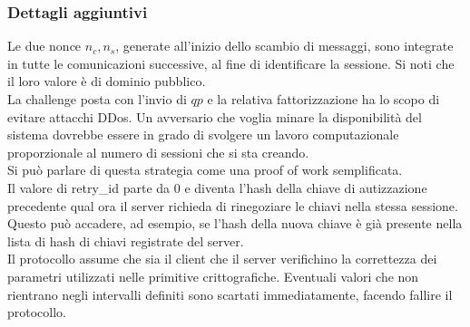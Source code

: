 \subsubsection{Dettagli aggiuntivi}
Le due nonce $n_c, n_s$, generate all'inizio dello scambio di messaggi, sono integrate in tutte le comunicazioni successive,
al fine di identificare la sessione.
Si noti che il loro valore è di dominio pubblico. \\

La challenge posta con l'invio di $qp$ e la relativa fattorizzazione ha lo scopo di evitare attacchi DDos.
Un avversario che voglia minare la disponibilità del sistema dovrebbe essere in grado di svolgere un lavoro computazionale
proporzionale al numero di sessioni che si sta creando. \\
Si può parlare di questa strategia come una proof of work semplificata. \\

Il valore di retry\_id parte da 0 e diventa l'hash della chiave di autizzazione precedente qual ora il server
richieda di rinegoziare le chiavi nella stessa sessione.
Questo può accadere, ad esempio, se l'hash della nuova chiave è già presente nella lista di hash di chiavi registrate del server. \\

Il protocollo assume che sia il client che il server verifichino la correttezza dei parametri utilizzati nelle primitive crittografiche.
Eventuali valori che non rientrano negli intervalli definiti sono scartati immediatamente, facendo fallire il protocollo.

